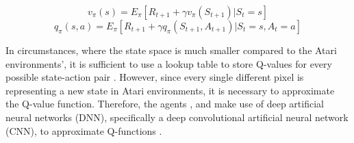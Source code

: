 \begin{equation}
v_{\pi}(s)=E_{\pi}[R_{t+1}+\gamma v_{\pi}(S_{t+1})|S_{t}=s]
\label{eq:statevalfunc}
\end{equation}
\begin{equation}
q_{\pi}(s,a) = E_{\pi} [R_{t+1} + \gamma q_{\pi}(S_{t+1}, A_{t+1}) | S_{t} = s, A_{t} = a]
\label{eq:qfunc}
\end{equation} 

In circumstances, where the state space is much smaller compared to the Atari environments', it is sufficient to use a lookup table to store Q-values for every possible state-action pair \cite[p.9]{richardsutton2018}. However, since every single different pixel is representing a new state in Atari environments, it is necessary to approximate the Q-value function. Therefore, the agents ,  and  make use of deep artificial neural networks (DNN), specifically a deep convolutional artificial neural network (CNN), to approximate Q-functions \cite{2013arXiv1312.5602M, 2017arXiv171002298H, 2018arXiv180300933H}.

